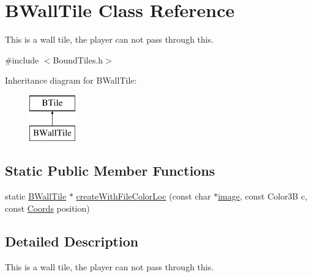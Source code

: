 \hypertarget{class_b_wall_tile}{\section{\-B\-Wall\-Tile \-Class \-Reference}
\label{class_b_wall_tile}
}


\-This is a wall tile, the player can not pass through this.  




{\ttfamily \#include $<$\-Bound\-Tiles.\-h$>$}

\-Inheritance diagram for \-B\-Wall\-Tile\-:\begin{figure}[H]
\begin{center}
\leavevmode
\includegraphics[height=2.000000cm]{class_b_wall_tile}
\end{center}
\end{figure}
\subsection*{\-Static \-Public \-Member \-Functions}
\begin{DoxyCompactItemize}
\item 
static \hyperlink{class_b_wall_tile}{\-B\-Wall\-Tile} $\ast$ \hyperlink{class_b_wall_tile_a834cb0c60a8fd985e3c1ac1845f4192f}{create\-With\-File\-Color\-Loc} (const char $\ast$\hyperlink{_game_list_8h_ac745ab21f82aa96829863dcfc37ef5a8}{image}, const \-Color3\-B c, const \hyperlink{struct_coords}{\-Coords} position)
\end{DoxyCompactItemize}


\subsection{\-Detailed \-Description}
\-This is a wall tile, the player can not pass through this. 

